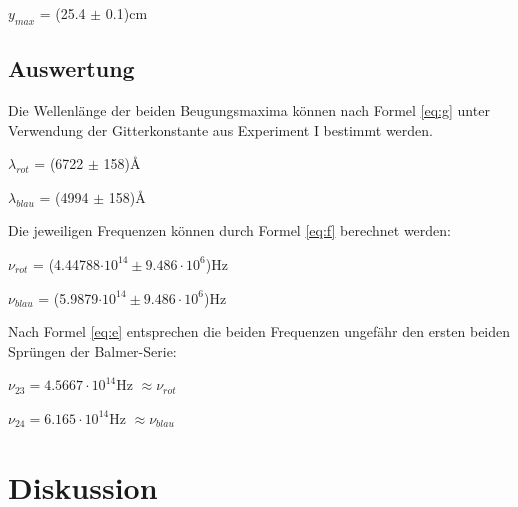 \documentclass[12pt,a4paper]{article}
\begin{document}
$y_{max}$ = (25.4 $\pm$ 0.1)cm

\subsection*{Auswertung}
Die Wellenl\"ange der beiden Beugungsmaxima k\"onnen nach Formel \ref{eq:g} unter Verwendung der Gitterkonstante aus Experiment I bestimmt werden.\vspace{5pt}

$\lambda_{rot}$ = (6722 $\pm$ 158)\AA

$\lambda_{blau}$ = (4994 $\pm$ 158)\AA

\vspace{5pt}
Die jeweiligen Frequenzen k\"onnen durch Formel \ref{eq:f} berechnet werden:\vspace{5pt}

$\nu_{rot}$ = (4.44788$\cdot 10^{14} \pm 9.486 \cdot 10^6$)Hz

$\nu_{blau}$ = (5.9879$\cdot 10^{14} \pm 9.486 \cdot 10^6$)Hz

\vspace{5pt}
Nach Formel \ref{eq:e} entsprechen die beiden Frequenzen ungef\"ahr den ersten beiden Spr\"ungen der Balmer-Serie:\vspace{5pt}

$\nu_{23} = 4.5667\cdot 10^{14}$Hz $\approx\nu_{rot}$

$\nu_{24} = 6.165\cdot 10^{14}$Hz $\approx\nu_{blau}$


\section*{Diskussion}
\end{document}
